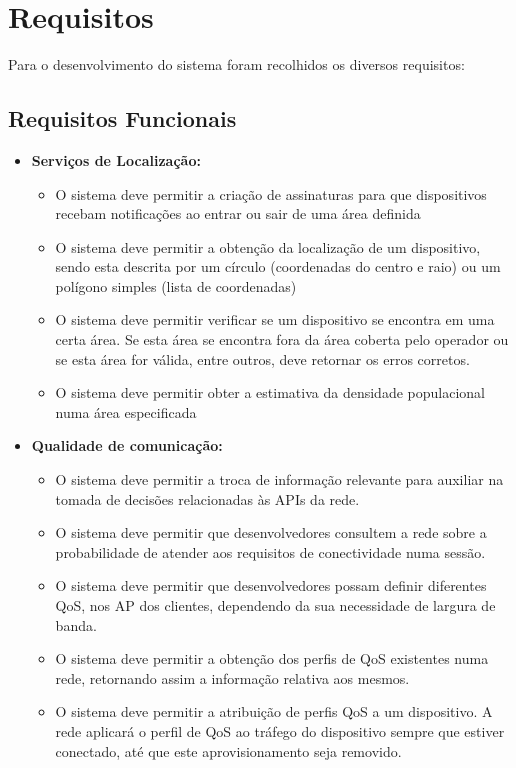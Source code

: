 \section{Requisitos}

Para o desenvolvimento do sistema foram recolhidos os diversos 
requisitos:

\subsection{Requisitos Funcionais}

\begin{itemize}
  \item \textbf{Serviços de Localização:}
    \begin{itemize}

      \item O sistema deve permitir a criação de assinaturas para que dispositivos recebam notificações ao entrar ou sair de uma área definida
      \item O sistema deve permitir a obtenção da localização de um dispositivo, sendo esta descrita por um círculo (coordenadas do centro e raio) ou um polígono simples (lista de coordenadas)
      \item O sistema deve permitir verificar se um dispositivo se encontra em uma certa área. Se esta área se encontra fora da área coberta pelo operador ou se esta área for válida, entre outros, deve retornar os erros corretos.
      \item O sistema deve permitir obter a estimativa da densidade populacional numa área especificada
    \end{itemize}

  \item \textbf{Qualidade de comunicação:}
    \begin{itemize}

      \item O sistema deve permitir a troca de informação relevante para auxiliar na tomada de decisões relacionadas às APIs da rede.
      \item O sistema deve permitir que desenvolvedores consultem a rede sobre a probabilidade de atender aos requisitos de conectividade numa sessão. 
      \item O sistema deve permitir que desenvolvedores possam definir diferentes QoS, nos AP dos clientes, dependendo da sua necessidade de largura de banda.
      \item O sistema deve permitir a obtenção dos perfis de QoS existentes numa rede, retornando assim a informação relativa aos mesmos.
      \item O sistema deve permitir a atribuição de perfis QoS a um dispositivo. A rede aplicará o perfil de QoS ao tráfego do dispositivo sempre que estiver conectado, até que este aprovisionamento seja removido.
    \end{itemize}


\end{itemize}

